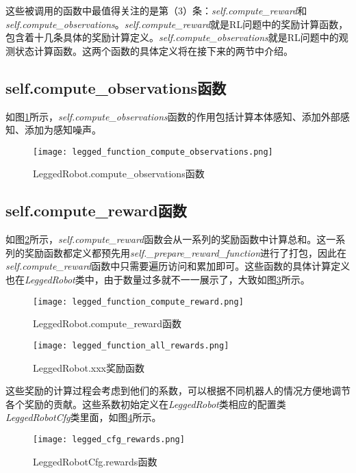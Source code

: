 这些被调用的函数中最值得关注的是第（3）条：\emph{self.compute\_reward}和\emph{self.compute\_observations}。\emph{self.compute\_reward}就是RL问题中的奖励计算函数，包含着十几条具体的奖励计算定义。\emph{self.compute\_observations}就是RL问题中的观测状态计算函数。这两个函数的具体定义将在接下来的两节中介绍。



\subsection[self.compute\_observations函数]{self.compute\_observations函数}
如图\ref{fig:legged_function_compute_observations}所示，\emph{self.compute\_observations}函数的作用包括计算本体感知、添加外部感知、添加为感知噪声。
\begin{figure}
  \centering
  \caption[LeggedRobot.compute\_observations函数]{LeggedRobot.compute\_observations函数}
  \label{fig:legged_function_compute_observations}
  \texttt{[image: legged\_function\_compute\_observations.png]}
\end{figure}

\subsection[self.compute\_reward函数]{self.compute\_reward函数}
如图\ref{fig:legged_function_compute_reward}所示，\emph{self.compute\_reward}函数会从一系列的奖励函数中计算总和。这一系列的奖励函数都定义都预先用\emph{self.\_prepare\_reward\_function}进行了打包，因此在\emph{self.compute\_reward}函数中只需要遍历访问和累加即可。这些函数的具体计算定义也在\emph{LeggedRobot}类中，由于数量过多就不一一展示了，大致如图\ref{fig:legged_function_all_rewards}所示。
\begin{figure}
  \centering
  \caption[LeggedRobot.compute\_reward函数]{LeggedRobot.compute\_reward函数}
  \label{fig:legged_function_compute_reward}
  \texttt{[image: legged\_function\_compute\_reward.png]}
\end{figure}

\begin{figure}
  \centering
  \caption[LeggedRobot.xxx奖励函数]{LeggedRobot.xxx奖励函数}
  \label{fig:legged_function_all_rewards}
  \texttt{[image: legged\_function\_all\_rewards.png]}
\end{figure}

这些奖励的计算过程会考虑到他们的系数，可以根据不同机器人的情况方便地调节各个奖励的贡献。这些系数初始定义在\emph{LeggedRobot}类相应的配置类\emph{LeggedRobotCfg}类里面，如图\ref{fig:legged_cfg_rewards}所示。

\begin{figure}
  \centering
  \caption[LeggedRobotCfg.rewards函数]{LeggedRobotCfg.rewards函数}
  \label{fig:legged_cfg_rewards}
  \texttt{[image: legged\_cfg\_rewards.png]}
\end{figure}



